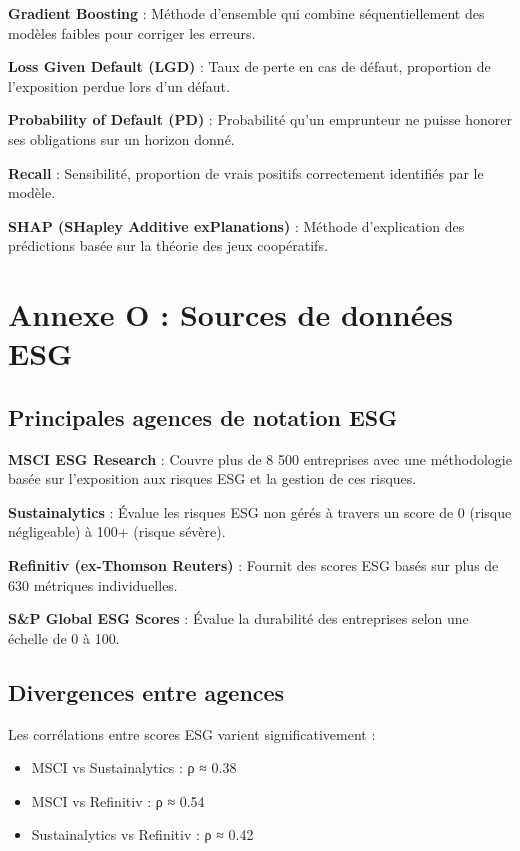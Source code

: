 \begin{table}[h]
\begin{table}[h]
\begin{table}[h]
\begin{table}[h]
\begin{table}[h]
\begin{table}[h]
\begin{table}[h]
\textbf{Gradient Boosting} : Méthode d'ensemble qui combine séquentiellement des modèles faibles pour corriger les erreurs.

\textbf{Loss Given Default (LGD)} : Taux de perte en cas de défaut, proportion de l'exposition perdue lors d'un défaut.

\textbf{Probability of Default (PD)} : Probabilité qu'un emprunteur ne puisse honorer ses obligations sur un horizon donné.

\textbf{Recall} : Sensibilité, proportion de vrais positifs correctement identifiés par le modèle.

\textbf{SHAP (SHapley Additive exPlanations)} : Méthode d'explication des prédictions basée sur la théorie des jeux coopératifs.

\section{Annexe O : Sources de données ESG}

\subsection{Principales agences de notation ESG}

\textbf{MSCI ESG Research} : Couvre plus de 8 500 entreprises avec une méthodologie basée sur l'exposition aux risques ESG et la gestion de ces risques.

\textbf{Sustainalytics} : Évalue les risques ESG non gérés à travers un score de 0 (risque négligeable) à 100+ (risque sévère).

\textbf{Refinitiv (ex-Thomson Reuters)} : Fournit des scores ESG basés sur plus de 630 métriques individuelles.

\textbf{S\&P Global ESG Scores} : Évalue la durabilité des entreprises selon une échelle de 0 à 100.

\subsection{Divergences entre agences}

Les corrélations entre scores ESG varient significativement :
\begin{itemize}
\item MSCI vs Sustainalytics : ρ ≈ 0.38
\item MSCI vs Refinitiv : ρ ≈ 0.54
\item Sustainalytics vs Refinitiv : ρ ≈ 0.42
\end{itemize}


\end{table}
\end{table}
\end{table}
\end{table}
\end{table}
\end{table}
\end{table}
